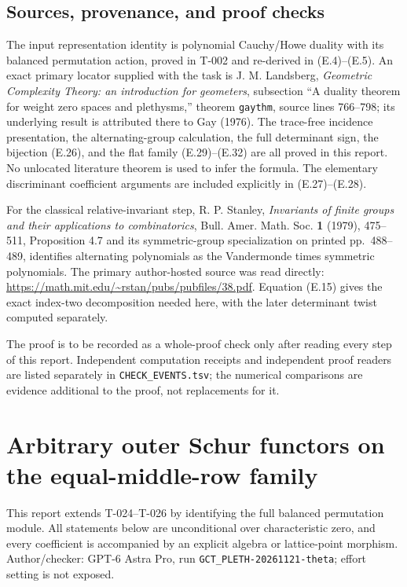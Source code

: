 \documentclass[
  10pt,
]{article}
\begin{document}
\subsection{Sources, provenance, and proof
checks}\label{sources-provenance-and-proof-checks}

The input representation identity is polynomial Cauchy/Howe duality with
its balanced permutation action, proved in T-002 and re-derived in
(E.4)--(E.5). An exact primary locator supplied with the task is J. M.
Landsberg, \emph{Geometric Complexity Theory: an introduction for
geometers}, subsection ``A duality theorem for weight zero spaces and
plethysms,'' theorem \texttt{\small gaythm}, source lines 766--798; its
underlying result is attributed there to Gay (1976). The trace-free
incidence presentation, the alternating-group calculation, the full
determinant sign, the bijection (E.26), and the flat family
(E.29)--(E.32) are all proved in this report. No unlocated literature
theorem is used to infer the formula. The elementary discriminant
coefficient arguments are included explicitly in (E.27)--(E.28).

For the classical relative-invariant step, R. P. Stanley,
\emph{Invariants of finite groups and their applications to
combinatorics}, Bull. Amer. Math. Soc. \textbf{1} (1979), 475--511,
Proposition 4.7 and its symmetric-group specialization on printed
pp.~488--489, identifies alternating polynomials as the Vandermonde
times symmetric polynomials. The primary author-hosted source was read
directly: \url{https://math.mit.edu/~rstan/pubs/pubfiles/38.pdf}.
Equation (E.15) gives the exact index-two decomposition needed here,
with the later determinant twist computed separately.

The proof is to be recorded as a whole-proof check only after reading
every step of this report. Independent computation receipts and
independent proof readers are listed separately in
\texttt{\small CHECK\_\allowbreak{}EVENTS.tsv}; the numerical
comparisons are evidence additional to the proof, not replacements for
it.

\section{Arbitrary outer Schur functors on the equal-middle-row
family}\label{arbitrary-outer-schur-functors-on-the-equal-middle-row-family}

This report extends T-024--T-026 by identifying the full balanced
permutation module. All statements below are unconditional over
characteristic zero, and every coefficient is accompanied by an explicit
algebra or lattice-point morphism. Author/checker: GPT-6 Astra Pro, run
\texttt{\small GCT\_\allowbreak{}PLETH-\allowbreak{}20261121-\allowbreak{}theta};
effort setting is not exposed.
\end{document}

